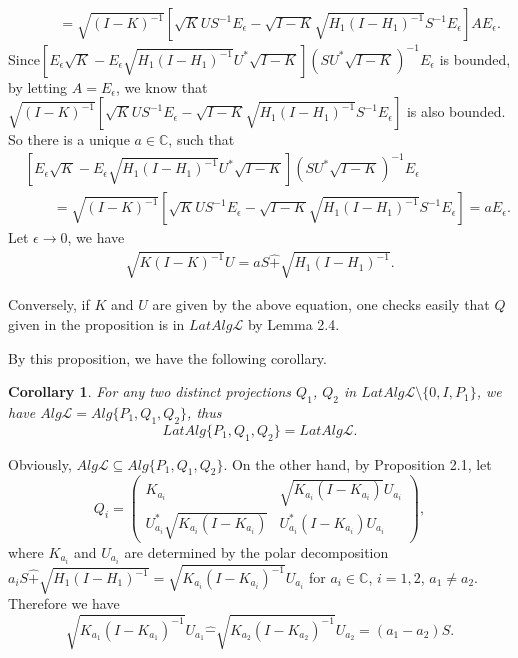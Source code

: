 \documentclass[12pt]{article}
\newtheorem{corollary}{Corollary}[section]
\newcommand{\LLL}{\mathcal L} %
\newcommand{\C}{\mathbb C} %
\begin{document}
{\begin{align*}
& \qquad = \sqrt{(I-K)^{-1}}\left[\sqrt{K}US^{-1}E_{\epsilon} -
\sqrt{I-K}\sqrt{H_{1}(I-H_{1})^{-1}}S^{-1}E_{\epsilon}\right] A E_\epsilon .
\end{align*}
Since$[ E_\epsilon\sqrt{K} -
E_\epsilon\sqrt{H_{1}(I-H_{1})^{-1}}U^{*}\sqrt{I-K}](SU^{*}\sqrt{I-K})^{-1}E_\epsilon
$ is bounded, by letting $A = E_\epsilon$, we know that
$\sqrt{(I-K)^{-1}}\left[\sqrt{K}US^{-1}E_{\epsilon} -
\sqrt{I-K}\sqrt{H_{1}(I-H_{1})^{-1}}S^{-1}E_{\epsilon}\right]$ is also
bounded. So there is a unique $a \in \mathbb{C}$, such that
\begin{align*}
&[E_\epsilon\sqrt{K} -
E_\epsilon\sqrt{H_{1}(I-H_{1})^{-1}}U^{*}\sqrt{I-K}](SU^{*}\sqrt{I-K})^{-1}E_\epsilon
\\
& \qquad =\sqrt{(I-K)^{-1}}\left[\sqrt{K}US^{-1}E_{\epsilon} -
\sqrt{I-K}\sqrt{H_{1}(I-H_{1})^{-1}}S^{-1}E_{\epsilon}\right] = a
E_\epsilon.
\end{align*}
Let $\epsilon \rightarrow 0$, we have
\begin{align*}
\sqrt{K(I-K)^{-1}}U = aS\widehat{+} \sqrt{H_{1}(I-H_{1})^{-1}}.
\end{align*}

Conversely, if  $K$ and $U$ are given by the above equation, one checks easily that $Q$ given in the proposition is
in $LatAlg\LLL$ by Lemma 2.4. \vspace{2mm}

By this proposition, we have the following corollary.

\begin{corollary}
For any two distinct projections $Q_1$, $Q_2$ in $LatAlg\LLL
\setminus \{ 0, I, P_1 \}$, we have  $ Alg\LLL =  Alg\{P_1, Q_1,
Q_2\}$, thus $$LatAlg\{P_1, Q_1, Q_2 \} = LatAlg\LLL.$$
\end{corollary}

\quad Obviously, $ Alg\LLL\subseteq Alg\{P_1,
Q_1, Q_2 \}$. On the other hand, by Proposition 2.1, let
$$Q_i= \left(\begin{array}{cc}K_{a_i}
& \sqrt{K_{a_i}(I-K_{a_i})}U_{a_i} \\U_{a_i}^{*}\sqrt{K_{a_i}(I-K_{a_i})} &
U_{a_i}^{*}(I-K_{a_i})U_{a_i}
\end{array}\right),
$$ where  $K_{a_i}$ and $U_{a_i}$ are determined by the polar
decomposition $a_i S\widehat{+ }\sqrt{H_{1}(I-H_{1})^{-1}}=
\sqrt{K_{a_i}(I-K_{a_i})^{-1}} U_{a_i}$ for $a_i\in \C$, $i=1,2$, 
$a_1\neq a_2$. Therefore we have $$\sqrt{K_{a_1}(I-K_{a_1})^{-1}}
U_{a_1}\widehat{-}\sqrt{K_{a_2}(I-K_{a_2})^{-1}} U_{a_2}=(a_1-a_2)S.$$

}
\end{document}

